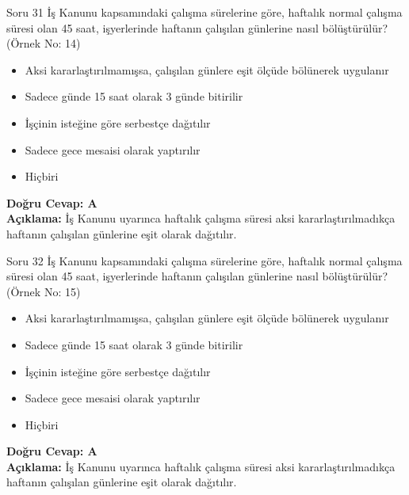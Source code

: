 \documentclass[12pt,a4paper]{article}
\begin{document}
\begin{testcard}{Soru 31}
    İş Kanunu kapsamındaki çalışma sürelerine göre, haftalık normal çalışma süresi olan 45 saat, işyerlerinde haftanın çalışılan günlerine nasıl bölüştürülür? (Örnek No: 14)
    \begin{itemize}
        \item[A)] Aksi kararlaştırılmamışsa, çalışılan günlere eşit ölçüde bölünerek uygulanır
        \item[B)] Sadece günde 15 saat olarak 3 günde bitirilir
        \item[C)] İşçinin isteğine göre serbestçe dağıtılır
        \item[D)] Sadece gece mesaisi olarak yaptırılır
        \item[E)] Hiçbiri
    \end{itemize}
    \tcblower
    \textbf{Doğru Cevap: A} \\
    \textbf{Açıklama:} İş Kanunu uyarınca haftalık çalışma süresi aksi kararlaştırılmadıkça haftanın çalışılan günlerine eşit olarak dağıtılır.
\end{testcard}

\begin{testcard}{Soru 32}
    İş Kanunu kapsamındaki çalışma sürelerine göre, haftalık normal çalışma süresi olan 45 saat, işyerlerinde haftanın çalışılan günlerine nasıl bölüştürülür? (Örnek No: 15)
    \begin{itemize}
        \item[A)] Aksi kararlaştırılmamışsa, çalışılan günlere eşit ölçüde bölünerek uygulanır
        \item[B)] Sadece günde 15 saat olarak 3 günde bitirilir
        \item[C)] İşçinin isteğine göre serbestçe dağıtılır
        \item[D)] Sadece gece mesaisi olarak yaptırılır
        \item[E)] Hiçbiri
    \end{itemize}
    \tcblower
    \textbf{Doğru Cevap: A} \\
    \textbf{Açıklama:} İş Kanunu uyarınca haftalık çalışma süresi aksi kararlaştırılmadıkça haftanın çalışılan günlerine eşit olarak dağıtılır.
\end{testcard}
\end{document}
